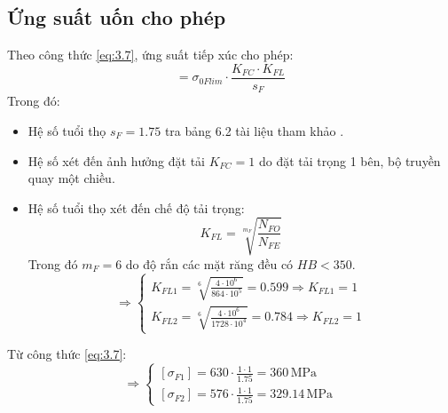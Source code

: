             \subsection{Ứng suất uốn cho phép}
                \hspace*{0.6cm}Theo công thức \ref{eq:3.7}, ứng suất tiếp xúc cho phép:
                \begin{equation*}
                    [\sigma_{F}] = \sigma_{0Flim} \cdot \frac{K_{FC} \cdot K_{FL}}{s_{F}}
                \end{equation*} 
                \hspace*{0.6cm}Trong đó:
                \begin{itemize}
                    \item Hệ số tuổi thọ $s_F = 1.75$ tra bảng 6.2 tài liệu tham khảo \cite{gtctm}.
                    \item Hệ số xét đến ảnh hưởng đặt tải $K_{FC} = 1$ do đặt tải trọng 1 bên, bộ truyền quay một chiều.
                    \item Hệ số tuổi thọ xét đến chế độ tải trọng: 
                        \begin{equation*}
                            K_{FL} = \sqrt[m_F]{\frac{N_{FO}}{N_{FE}}} 
                        \end{equation*}
                        Trong đó $m_F = 6$ do độ rắn các mặt răng đều có $HB < 350$.\\[0.2cm]
                        \[
                        \Rightarrow
                        \begin{cases}
                            K_{FL1} = \sqrt[6]{\frac{4 \cdot 10^6}{864 \cdot 10^5}} = 0.599 \Rightarrow K_{FL1} = 1\\
                            K_{FL2} = \sqrt[6]{\frac{4 \cdot 10^6}{1728 \cdot 10^4}} = 0.784 \Rightarrow K_{FL2} = 1
                        \end{cases}
                        \]
                \end{itemize}
                \hspace*{0.6cm}Từ công thức \ref{eq:3.7}:
                \[
                \Rightarrow
                \begin{cases}
                    [\sigma_{F1}] = 630 \cdot \frac{1 \cdot 1}{1.75} = 360 \, \mathrm{MPa} \\
                    [\sigma_{F2}] = 576 \cdot \frac{1 \cdot 1}{1.75} = 329.14 \, \mathrm{MPa}
                \end{cases}
                \] 
